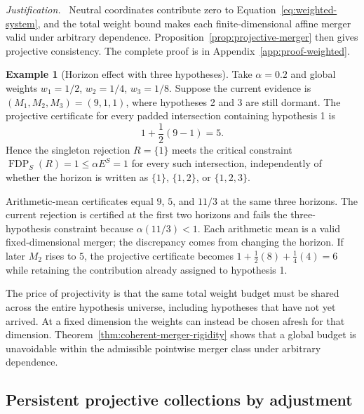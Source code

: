 \documentclass[11pt]{article}
\numberwithin{equation}{section}
\theoremstyle{plain}
\theoremstyle{definition}
\newtheorem{example}[theorem]{Example}
\newcommand{\FDP}{\operatorname{FDP}}
\newcommand{\justification}{\par\medskip\noindent\textit{Justification.}\ }
\begin{document}
\justification
Neutral coordinates contribute zero to Equation~\eqref{eq:weighted-system}, and the total weight bound makes each finite-dimensional affine merger valid under arbitrary dependence. Proposition~\ref{prop:projective-merger} then gives projective consistency. The complete proof is in Appendix~\ref{app:proof-weighted}.

\begin{example}[Horizon effect with three hypotheses]\label{ex:three-hypothesis-projective}
Take $\alpha=0.2$ and global weights $w_1=1/2$, $w_2=1/4$, $w_3=1/8$. Suppose the current evidence is $(M_1,M_2,M_3)=(9,1,1)$, where hypotheses 2 and 3 are still dormant. The projective certificate for every padded intersection containing hypothesis 1 is
\[
  1+\frac12(9-1)=5.
\]
Hence the singleton rejection $R=\{1\}$ meets the critical constraint $\FDP_S(R)=1\leq\alpha E^S=1$ for every such intersection, independently of whether the horizon is written as $\{1\}$, $\{1,2\}$, or $\{1,2,3\}$.

Arithmetic-mean certificates equal $9$, $5$, and $11/3$ at the same three horizons. The current rejection is certified at the first two horizons and fails the three-hypothesis constraint because $\alpha(11/3)<1$. Each arithmetic mean is a valid fixed-dimensional merger; the discrepancy comes from changing the horizon. If later $M_2$ rises to $5$, the projective certificate becomes $1+\tfrac12(8)+\tfrac14(4)=6$ while retaining the contribution already assigned to hypothesis 1.
\end{example}

The price of projectivity is that the same total weight budget must be shared across the entire hypothesis universe, including hypotheses that have not yet arrived. At a fixed dimension the weights can instead be chosen afresh for that dimension. Theorem~\ref{thm:coherent-merger-rigidity} shows that a global budget is unavoidable within the admissible pointwise merger class under arbitrary dependence.

\subsection{Persistent projective collections by adjustment}\label{sec:adjuster}
\end{document}
